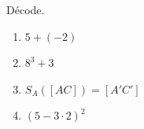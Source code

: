 %
%
    Décode.
    \begin{enumerate}[cols=4]
        \item $5+\left(-2\right)$
        \item $8^3+3$
        \item $S_A ([AC])= [A'C']$
        \item $\left(5-3\cdot2\right)^2$
    \end{enumerate}
